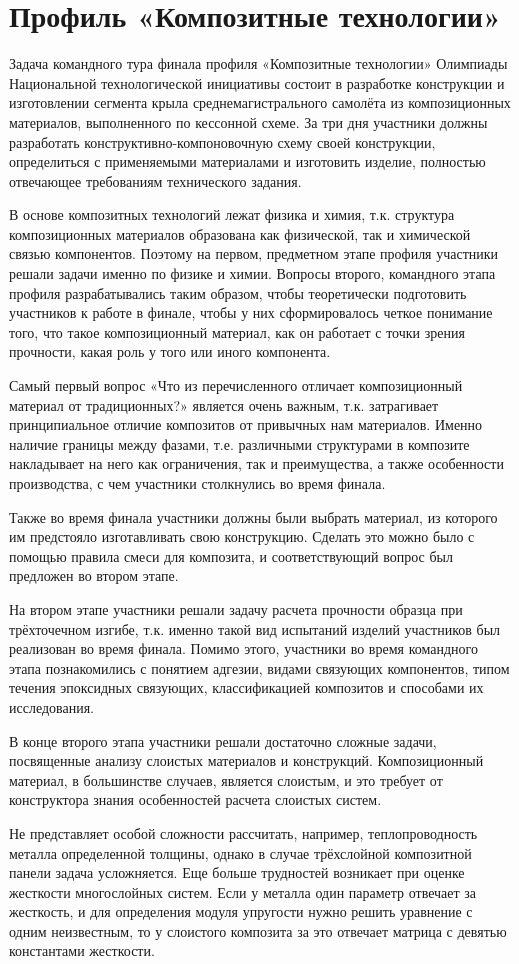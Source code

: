 

\chapter{Профиль «Композитные технологии»}

Задача командного тура финала профиля «Композитные технологии»
Олимпиады Национальной технологической инициативы состоит в
разработке конструкции и изготовлении сегмента крыла
среднемагистрального самолёта из композиционных материалов,
выполненного по кессонной схеме. За три дня участники должны разработать
конструктивно-компоновочную схему своей конструкции, определиться с
применяемыми материалами и изготовить изделие, полностью отвечающее
требованиям технического задания.

В основе композитных технологий лежат физика и химия, т.к.
структура композиционных материалов образована как физической, так и
химической связью компонентов. Поэтому на первом, предметном этапе
профиля участники решали задачи именно по физике и химии.
Вопросы второго, командного этапа профиля разрабатывались таким
образом, чтобы теоретически подготовить участников к работе в финале,
чтобы у них сформировалось четкое понимание того, что такое
композиционный материал, как он работает с точки зрения прочности, какая
роль у того или иного компонента.

Самый первый вопрос «Что из перечисленного отличает
композиционный материал от традиционных?» является очень важным, т.к.
затрагивает принципиальное отличие композитов от привычных нам
материалов. Именно наличие границы между фазами, т.е. различными
структурами в композите накладывает на него как ограничения, так и
преимущества, а также особенности производства, с чем участники
столкнулись во время финала.

Также во время финала участники должны были выбрать материал, из
которого им предстояло изготавливать свою конструкцию. Сделать это
можно было с помощью правила смеси для композита, и соответствующий
вопрос был предложен во втором этапе.

На втором этапе участники решали задачу расчета прочности образца
при трёхточечном изгибе, т.к. именно такой вид испытаний изделий
участников был реализован во время финала.
Помимо этого, участники во время командного этапа познакомились с
понятием адгезии, видами связующих компонентов, типом течения
эпоксидных связующих, классификацией композитов и способами их
исследования.

В конце второго этапа участники решали достаточно сложные задачи,
посвященные анализу слоистых материалов и конструкций.
Композиционный материал, в большинстве случаев, является слоистым, и
это требует от конструктора знания особенностей расчета слоистых систем.

Не представляет особой сложности рассчитать, например, теплопроводность
металла определенной толщины, однако в случае трёхслойной композитной
панели задача усложняется. Еще больше трудностей возникает при оценке
жесткости многослойных систем. Если у металла один параметр отвечает за
жесткость, и для определения модуля упругости нужно решить уравнение с
одним неизвестным, то у слоистого композита за это отвечает матрица с
девятью константами жесткости.